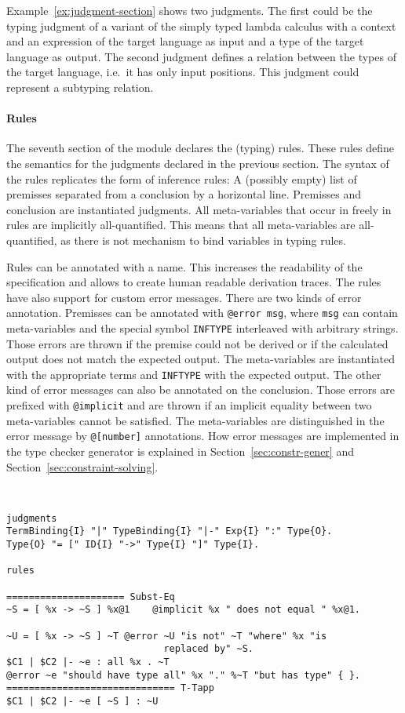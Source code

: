 Example~\ref{ex:judgment-section} shows two judgments. The first could
be the typing judgment of a variant of the simply typed lambda
calculus with a context and an expression of the target language as
input and a type of the target language as output. The second judgment
defines a relation between the types of the target language, i.e.\ it
has only input positions. This judgment could represent a subtyping
relation.

\paragraph{Rules} The seventh section of the module declares the
(typing) rules. These rules define the semantics for the judgments
declared in the previous section. The syntax of the rules replicates
the form of inference rules: A (possibly empty) list of premisses
separated from a conclusion by a horizontal line. Premisses and
conclusion are instantiated judgments. All meta-variables that occur
in freely in rules are implicitly all-quantified. This means that all
meta-variables are all-quantified, as there is not mechanism to bind
variables in typing rules.

Rules can be annotated with a name. This increases the readability of
the specification and allows to create human readable derivation
traces. The rules have also support for custom error messages. There
are two kinds of error annotation. Premisses can be annotated with
\verb|@error msg|, where \verb|msg| can contain meta-variables and the
special symbol \verb|INFTYPE| interleaved with arbitrary
strings. Those errors are thrown if the premise could not be derived
or if the calculated output does not match the expected output. The
meta-variables are instantiated with the appropriate terms and
\verb|INFTYPE| with the expected output. The other kind of error
messages can also be annotated on the conclusion. Those errors are
prefixed with \verb|@implicit| and are thrown if an implicit equality
between two meta-variables cannot be satisfied. The meta-variables are
distinguished in the error message by \verb|@[number]|
annotations. How error messages are implemented in the type checker
generator is explained in Section~\ref{sec:constr-gener} and
Section~\ref{sec:constraint-solving}.

\begin{example}{~}
\begin{lstlisting}[language=sltc]
judgments
TermBinding{I} "|" TypeBinding{I} "|-" Exp{I} ":" Type{O}.
Type{O} "= [" ID{I} "->" Type{I} "]" Type{I}.

rules

===================== Subst-Eq
~S = [ %x -> ~S ] %x@1    @implicit %x " does not equal " %x@1.

~U = [ %x -> ~S ] ~T @error ~U "is not" ~T "where" %x "is
                            replaced by" ~S.
$C1 | $C2 |- ~e : all %x . ~T 
@error ~e "should have type all" %x "." %~T "but has type" { }.
============================== T-Tapp
$C1 | $C2 |- ~e [ ~S ] : ~U
\end{lstlisting}
\label{ex:rules}
\end{example}

